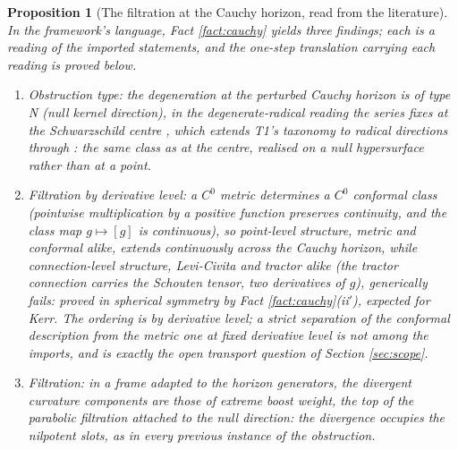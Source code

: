 \documentclass[11pt]{article}
\newtheorem{proposition}[theorem]{Proposition}
\theoremstyle{definition}
\begin{document}
\begin{proposition}[The filtration at the Cauchy horizon, read from the literature]\label{prop:ordering}
In the framework's language, Fact \ref{fact:cauchy} yields three findings; each is a reading of the imported statements, and the one-step translation carrying each reading is proved below.
\begin{enumerate}
\item \emph{Obstruction type:} the degeneration at the perturbed Cauchy horizon is of type N (null kernel direction), in the degenerate-radical reading the series fixes at the Schwarzschild centre \cite[Prop.~3.1]{ButlerT5}, which extends T1's taxonomy \cite[Def.~3.1]{ButlerT1} to radical directions through \cite[Thm.~4.4, Cor.~4.5]{ButlerT4}: the same class as at the centre, realised on a null hypersurface rather than at a point.
\item \emph{Filtration by derivative level:} a $C^0$ metric determines a $C^0$ conformal class (pointwise multiplication by a positive function preserves continuity, and the class map $g \mapsto [g]$ is continuous), so point-level structure, metric and conformal alike, extends continuously across the Cauchy horizon, while connection-level structure, Levi-Civita and tractor alike (the tractor connection carries the Schouten tensor, two derivatives of $g$), generically fails: proved in spherical symmetry by Fact \ref{fact:cauchy}(ii$'$), expected for Kerr. The ordering is by derivative level; a strict separation of the conformal description from the metric one at fixed derivative level is not among the imports, and is exactly the open transport question of Section \ref{sec:scope}.
\item \emph{Filtration:} in a frame adapted to the horizon generators, the divergent curvature components are those of extreme boost weight, the top of the parabolic filtration attached to the null direction: the divergence occupies the nilpotent slots, as in every previous instance of the obstruction.
\end{enumerate}
\end{proposition}
\end{document}
